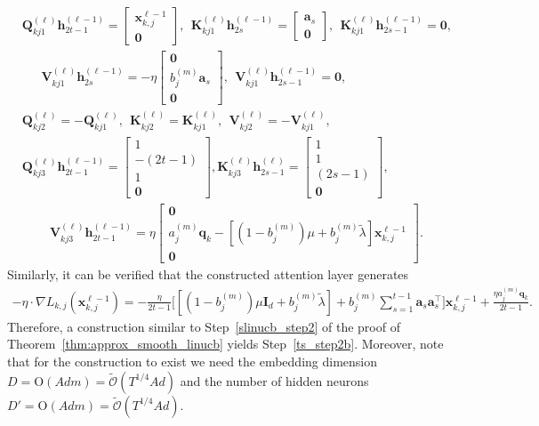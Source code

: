 \documentclass[10pt]{article}
\newcommand{\id}{\bI}
\newcommand{\<}{\left\langle}
\renewcommand{\>}{\right\rangle}
\renewcommand{\bQ}{\mathbf{Q}}
\newcommand{\bzero}{{\mathbf 0}}
\newcommand{\prodeig}{{\mu}}
\newcommand{\intvec}{{\mathbf {q}}}
\newcommand{\tcO}{{\tilde{\mathcal O}}}
\newcommand{\hidden}{{D'}}
\newcommand{\conO}{{\mathrm{O}}}
\def\bI{{\mathbf I}}
\def\bK{{\mathbf K}}
\def\bQ{{\mathbf Q}}
\def\bV{{\mathbf V}}
\def\ba{{\mathbf a}}
\def\bh{{\mathbf h}}
\def\bx{{\mathbf x}}
\begin{document}
\begin{align*}
    &\bQ_{kj1}^{(\ell)}\bh^{(\ell-1)}_{2t-1}=\begin{bmatrix}
        \bx_{k,j}^{\ell-1}\\\bzero
    \end{bmatrix},~~ \bK_{kj1}^{(\ell)}\bh^{(\ell-1)}_{2s}=\begin{bmatrix}
        \ba_{s}\\\bzero
\end{bmatrix},~~\bK_{kj1}^{(\ell)}\bh^{(\ell-1)}_{2s-1}=\bzero,\\
&~~~~ ~~~\bV_{kj1}^{(\ell)}\bh^{(\ell-1)}_{2s}=-\eta\begin{bmatrix}
        \bzero\\ b_j^{(m)}\ba_s \\ \bzero
    \end{bmatrix},~~\bV_{kj1}^{(\ell)}\bh^{(\ell-1)}_{2s-1}=\bzero,\\
    &
    \bQ_{kj2}^{(\ell)}=-\bQ_{kj1}^{(\ell)},~~ \bK_{kj2}^{(\ell)}=\bK_{kj1}^{(\ell)},~~  \bV_{kj2}^{(\ell)}=-\bV_{kj1}^{(\ell)},\\











     &
     \bQ_{kj3}^{(\ell)}\bh^{(\ell-1)}_{2t-1}=\begin{bmatrix}
         1\\-(2t-1)\\ 1\\\bzero
    \end{bmatrix},



\bK_{kj3}^{(\ell)}\bh^{(\ell)}_{2s-1}=\begin{bmatrix}
        1\\ 1 \\(2s-1)\\\bzero
    \end{bmatrix}, \\&\qquad~\bV_{kj3}^{(\ell)}\bh^{(\ell-1)}_{2t-1}=\eta\begin{bmatrix}
        \bzero\\ a_j^{(m)}\intvec_k-[(1-b_j^{(m)})\prodeig+b_j^{(m)}\tilde\lambda]\bx_{k,j}^{\ell-1}\\ \bzero
    \end{bmatrix}.
\end{align*}
Similarly, it can be verified that the constructed attention layer generates
\begin{align*}
  -\eta\cdot\nabla L_{k,j}(\bx_{k,j}^{\ell-1})=-\frac{\eta}{2t-1}\Big[ [(1-b_j^{(m)})\prodeig\id_d+b_j^{(m)}\tilde\lambda]+b_j^{(m)}\sum_{s=1}^{t-1}\ba_s\ba_s^\top \Big]\bx_{k,j}^{\ell-1}+\frac{\eta a_j^{(m)}\intvec_k}{2t-1}.
\end{align*}
Therefore,  a  construction similar to  Step~\ref{slinucb_step2} of the proof of Theorem~\ref{thm:approx_smooth_linucb} yields Step~\ref{ts_step2b}. Moreover, note that for the construction to exist  we need the embedding dimension  $D=\conO(Adm)=\tcO(T^{1/4}Ad)$ and the number of hidden neurons $\hidden=\conO(Adm)=\tcO(T^{1/4}Ad)$.
\end{document}
